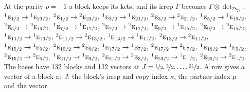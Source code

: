\documentclass[10pt,a4paper]{article}
\numberwithin{equation}{section}
\newcommand{\grp}[1]{\mathsf{#1}}
\newcommand{\irr}[1]{\text{\normalfont\scshape #1}}
\newcommand{\conjpair}[1]{{}^{#1}}
\newcommand{\irrprod}{\otimes}
\newcommand{\mult}{\kappa}
\newcommand{\intx}{\mu}
\begin{document}
At the parity $p = -1$ a block keeps its kets, and its irrep $\Gamma$ becomes $\Gamma \irrprod \det_{\grp{2S_{24}}}$: $\conjpair{1}\irr{e}_{1/2} \to \conjpair{1}\irr{e}_{23/2}$, $\conjpair{2}\irr{e}_{1/2} \to \conjpair{2}\irr{e}_{23/2}$, $\conjpair{1}\irr{e}_{3/2} \to \conjpair{1}\irr{e}_{21/2}$, $\conjpair{2}\irr{e}_{3/2} \to \conjpair{2}\irr{e}_{21/2}$, $\conjpair{1}\irr{e}_{5/2} \to \conjpair{1}\irr{e}_{19/2}$, $\conjpair{2}\irr{e}_{5/2} \to \conjpair{2}\irr{e}_{19/2}$, $\conjpair{1}\irr{e}_{7/2} \to \conjpair{1}\irr{e}_{17/2}$, $\conjpair{2}\irr{e}_{7/2} \to \conjpair{2}\irr{e}_{17/2}$, $\conjpair{1}\irr{e}_{9/2} \to \conjpair{1}\irr{e}_{15/2}$, $\conjpair{2}\irr{e}_{9/2} \to \conjpair{2}\irr{e}_{15/2}$, $\conjpair{1}\irr{e}_{11/2} \to \conjpair{1}\irr{e}_{13/2}$, $\conjpair{2}\irr{e}_{11/2} \to \conjpair{2}\irr{e}_{13/2}$, $\conjpair{1}\irr{e}_{13/2} \to \conjpair{1}\irr{e}_{11/2}$, $\conjpair{2}\irr{e}_{13/2} \to \conjpair{2}\irr{e}_{11/2}$, $\conjpair{1}\irr{e}_{15/2} \to \conjpair{1}\irr{e}_{9/2}$, $\conjpair{2}\irr{e}_{15/2} \to \conjpair{2}\irr{e}_{9/2}$, $\conjpair{1}\irr{e}_{17/2} \to \conjpair{1}\irr{e}_{7/2}$, $\conjpair{2}\irr{e}_{17/2} \to \conjpair{2}\irr{e}_{7/2}$, $\conjpair{1}\irr{e}_{19/2} \to \conjpair{1}\irr{e}_{5/2}$, $\conjpair{2}\irr{e}_{19/2} \to \conjpair{2}\irr{e}_{5/2}$, $\conjpair{1}\irr{e}_{21/2} \to \conjpair{1}\irr{e}_{3/2}$, $\conjpair{2}\irr{e}_{21/2} \to \conjpair{2}\irr{e}_{3/2}$, $\conjpair{1}\irr{e}_{23/2} \to \conjpair{1}\irr{e}_{1/2}$, $\conjpair{2}\irr{e}_{23/2} \to \conjpair{2}\irr{e}_{1/2}$.
The bases have 132 blocks and 132 vectors at $J = \nicefrac{1}{2}, \nicefrac{3}{2}, \dots, \nicefrac{21}{2}$. \label{n:index.copy}\label{n:head.vector}A row gives a vector of a block at $J$: the block's irrep and copy index $\mult$, the partner index $\intx$ and the vector.
\end{document}
